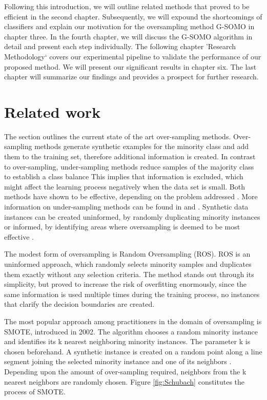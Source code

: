 \documentclass[parskip=full]{scrartcl}
\begin{document}
Following this introduction, we will outline related methods that proved to be
efficient in the second chapter. Subsequently, we will expound the shortcomings
of classifiers and explain our motivation for the oversampling method G-SOMO in
chapter three. In the fourth chapter, we will discuss the G-SOMO algorithm in
detail and present each step individually. The following chapter 'Research
Methodology‘ covers our experimental pipeline to validate the performance of our
proposed method. We will present our significant results in chapter six. The
last chapter will summarize our findings and provides a prospect for further
research.

\section{Related work}

The section outlines the current state of the art over-sampling methods.
Over-sampling methods generate synthetic examples for the minority class and add
them to the training set, therefore additional information is created. In
contrast to over-sampling, under-sampling methods reduce samples of the majority
class to establish a class balance This implies that information is excluded,
which might affect the learning process negatively when the data set is small.
Both methods have shown to be effective, depending on the problem addressed
\cite{Chawla2002}. More information on under-sampling methods can be found in
\cite{Ganganwar2012} and \cite{Yen2006}. Synthetic data instances can be created
uninformed, by randomly duplicating minority instances or informed, by
identifying areas where oversampling is deemed to be most effective
\cite{Last2017}. 

The modest form of oversampling is Random Oversampling (ROS). ROS is an
uninformed approach, which randomly selects minority samples and duplicates them
exactly without any selection criteria. The method stands out through its
simplicity, but proved to increase the risk of overfitting enormously, since the
same information is used multiple times during the training process, no
instances that clarify the decision boundaries are created. 

The most popular approach among practitioners in the domain of oversampling is
SMOTE, introduced in 2002. The algorithm chooses a random minority instance and
identifies its k nearest neighboring minority instances. The parameter k is
chosen beforehand. A synthetic instance is created on a random point along a
line segment joining the selected minority instance and one of its neighbors
\cite{Chawla2002}.  Depending upon the amount of over-sampling required,
neighbors from the k nearest neighbors are randomly chosen. Figure
\ref{fig:Schubach} constitutes the process of SMOTE.
\end{document}
